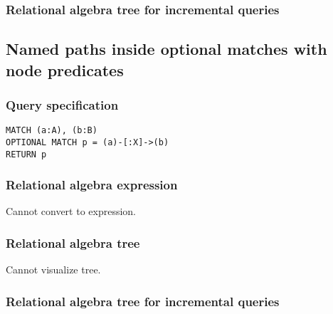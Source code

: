 \subsubsection*{Relational algebra tree for incremental queries}


\subsection{Named paths inside optional matches with node predicates}

\subsubsection*{Query specification}

\begin{lstlisting}
MATCH (a:A), (b:B)
OPTIONAL MATCH p = (a)-[:X]->(b)
RETURN p
\end{lstlisting}

\subsubsection*{Relational algebra expression}

Cannot convert to expression.

\subsubsection*{Relational algebra tree}

Cannot visualize tree.

\subsubsection*{Relational algebra tree for incremental queries}

